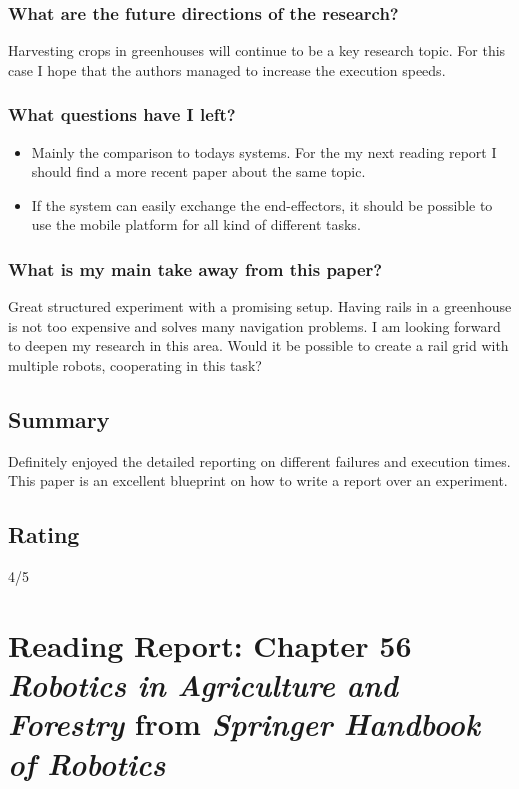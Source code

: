\documentclass{article}
\begin{document}
\subsubsection*{What are the future directions of the research?}
Harvesting crops in greenhouses will continue to be a key research topic. For this case I hope that the authors managed to increase the execution speeds.
\subsubsection*{What questions have I left?} 
\begin{itemize}
    \item Mainly the comparison to todays systems. For the my next reading report I should find a more recent paper about the same topic.
    \item If the system can easily exchange the end-effectors, it should be possible to use the mobile platform for all kind of different tasks.
\end{itemize}
\subsubsection*{What is my main take away from this paper?}
Great structured experiment with a promising setup. Having rails in a greenhouse is not too expensive and solves many navigation problems. I am looking forward to deepen my research in this area.
Would it be possible to create a rail grid with multiple robots, cooperating in this task?

\subsection*{Summary}
Definitely enjoyed the detailed reporting on different failures and execution times. This paper is an excellent blueprint on how to write a report over an experiment.


\subsection*{Rating}
4/5


\section{Reading Report: Chapter 56 \emph{Robotics in Agriculture and Forestry} from \emph{Springer Handbook of Robotics}}
\cite{Siciliano2016}
\end{document}
